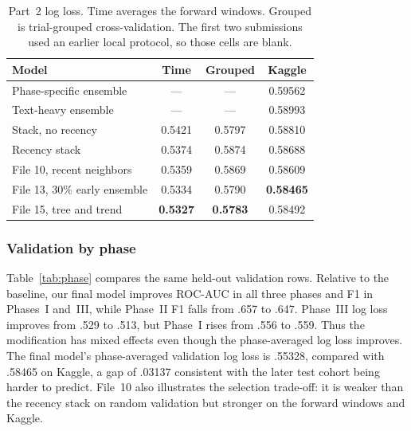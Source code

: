 \documentclass[10pt,twocolumn,letterpaper]{article}
\begin{document}
\begin{table}[t]
\centering\small
\setlength{\tabcolsep}{3pt}
\begin{tabular*}{\columnwidth}{@{\extracolsep{\fill}}lccc@{}}
\toprule
Model & Time & Grouped & Kaggle \\
\midrule
Phase-specific ensemble & --- & --- & 0.59562 \\
Text-heavy ensemble & --- & --- & 0.58993 \\
Stack, no recency & 0.5421 & 0.5797 & 0.58810 \\
Recency stack & 0.5374 & 0.5874 & 0.58688 \\
File 10, recent neighbors & 0.5359 & 0.5869 & 0.58609 \\
File 13, 30\% early ensemble & 0.5334 & 0.5790 & \textbf{0.58465} \\
File 15, tree and trend & \textbf{0.5327} & \textbf{0.5783} & 0.58492 \\
\bottomrule
\end{tabular*}
\caption{Part~2 log loss. Time averages the forward windows. Grouped is
trial-grouped cross-validation. The first two submissions used an earlier
local protocol, so those cells are blank.}
\label{tab:p2}
\end{table}

\subsubsection{Validation by phase}

Table~\ref{tab:phase} compares the same held-out validation rows. Relative to
the baseline, our final model improves ROC-AUC in all three phases and F1 in
Phases~I and~III, while Phase~II F1 falls from .657 to .647. Phase~III log loss
improves from .529 to .513, but Phase~I rises from .556 to .559. Thus the
modification has mixed effects even though the phase-averaged log loss improves.
The final model's phase-averaged validation log loss is .55328, compared with
.58465 on Kaggle, a gap of .03137 consistent with the later test cohort being
harder to predict. File~10 also illustrates the selection trade-off: it is
weaker than the recency stack on random validation but stronger on the forward
windows and Kaggle.
\end{document}
